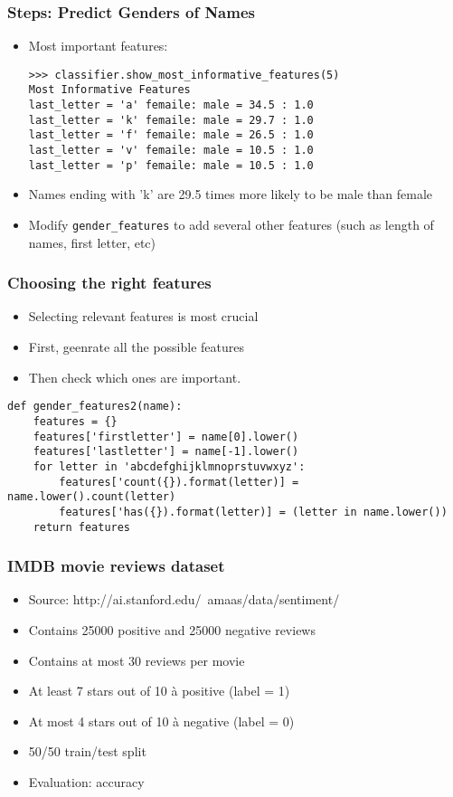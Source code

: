 \begin{frame}[fragile]\frametitle{Steps: Predict Genders of Names}
  \begin{itemize}
\item Most important features:
\begin{lstlisting}
>>> classifier.show_most_informative_features(5)
Most Informative Features
last_letter = 'a' femaile: male = 34.5 : 1.0
last_letter = 'k' femaile: male = 29.7 : 1.0
last_letter = 'f' femaile: male = 26.5 : 1.0
last_letter = 'v' femaile: male = 10.5 : 1.0
last_letter = 'p' femaile: male = 10.5 : 1.0
\end{lstlisting}
\item Names ending with 'k' are 29.5 times more likely to be male than female
\item Modify \lstinline|gender_features| to add several other features (such as length of names, first letter, etc)
  \end{itemize}
\end{frame}

\begin{frame}[fragile]\frametitle{Choosing the right features}
  \begin{itemize}
\item Selecting relevant features is most crucial
\item First, geenrate all the possible features
\item Then check which ones are important.
  \end{itemize}
\begin{lstlisting}
def gender_features2(name):
	features = {}
	features['firstletter'] = name[0].lower()
	features['lastletter'] = name[-1].lower()
	for letter in 'abcdefghijklmnoprstuvwxyz':
		features['count({}).format(letter)] = name.lower().count(letter)
		features['has({}).format(letter)] = (letter in name.lower())
	return features
\end{lstlisting}
\end{frame}


\begin{frame}[fragile]\frametitle{IMDB movie reviews dataset}
  \begin{itemize}
\item Source:  http://ai.stanford.edu/~amaas/data/sentiment/
\item Contains 25000 positive and 25000 negative reviews
\item  Contains at most 30 reviews per movie
\item  At least 7 stars out of 10 à positive (label = 1)
\item  At most 4 stars out of 10 à negative (label = 0)
\item  50/50 train/test split
\item  Evaluation: accuracy
  \end{itemize}
\end{frame}

